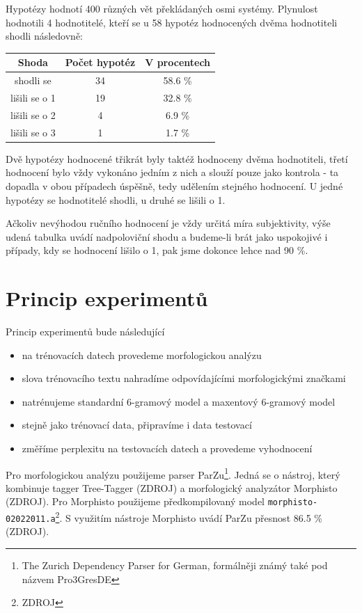 \documentclass[12pt,a4paper]{report}
\begin{document}
Hypotézy hodnotí 400 různých vět překládaných osmi systémy. Plynulost hodnotili 4 hodnotitelé, kteří se u 58 hypotéz hodnocených dvěma hodnotiteli shodli následovně:

\begin{center}\begin{tabular}{|c|c|c|}
	\hline
	\textbf{Shoda} & \textbf{Počet hypotéz} & \textbf{V procentech}\\
	\hline
	shodli se & 34 & 58.6 \%\\
	\hline
	lišili se o 1 & 19 & 32.8 \%\\
	\hline
	lišili se o 2 & 4 & 6.9 \%\\
	\hline
	lišili se o 3 & 1 & 1.7 \%\\
	\hline
\end{tabular}\end{center}

Dvě hypotézy hodnocené třikrát byly taktéž hodnoceny dvěma hodnotiteli, třetí hodnocení bylo vždy vykonáno jedním z nich a slouží pouze jako kontrola - ta dopadla v obou případech úspěšně, tedy udělením stejného hodnocení. U jedné hypotézy se hodnotitelé shodli, u druhé se lišili o 1.

Ačkoliv nevýhodou ručního hodnocení je vždy určitá míra subjektivity, výše udená tabulka uvádí nadpoloviční shodu a budeme-li brát jako uspokojivé i případy, kdy se hodnocení lišilo o 1, pak jsme dokonce lehce nad 90 \%.

\section{Princip experimentů}

Princip experimentů bude následující
\begin{itemize}
\item{na trénovacích datech provedeme morfologickou analýzu}
\item{slova trénovacího textu nahradíme odpovídajícími morfologickými značkami}
\item{natrénujeme standardní 6-gramový model a maxentový 6-gramový model}
\item{stejně jako trénovací data, připravíme i data testovací}
\item{změříme perplexitu na testovacích datech a provedeme vyhodnocení}
\end{itemize}

Pro morfologickou analýzu použijeme parser ParZu\footnote{The Zurich Dependency Parser for German, formálněji známý také pod názvem Pro3GresDE}. Jedná se o nástroj, který kombinuje tagger Tree-Tagger (ZDROJ) a morfologický analyzátor Morphisto (ZDROJ). Pro Morphisto použijeme předkompilovaný model \texttt{morphisto-02022011.a}\footnote{ZDROJ}. S využitím nástroje Morphisto uvádí ParZu přesnost 86.5 \% (ZDROJ).
\end{document}
